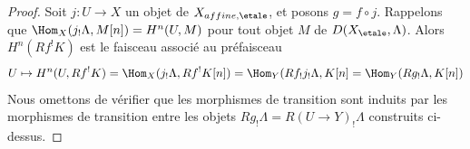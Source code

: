 \begin{proof}
Soit $j : U \to X$ un objet de $X_{affine, \etale}$, et posons $g = f \circ j$.
Rappelons que $\Hom_X(j_!\Lambda, M[n]) = H^n(U, M)$ pour tout objet $M$ de
$D(X_\etale, \Lambda)$. Alors $H^n(Rf^!K)$ est le faisceau associé au
préfaisceau
$$
U \mapsto H^n(U, Rf^!K) = \Hom_X(j_!\Lambda, Rf^!K[n]) =
\Hom_Y(Rf_!j_!\Lambda, K[n] = \Hom_Y(Rg_!\Lambda, K[n])
$$
Nous omettons de vérifier que les morphismes de transition sont induits par les morphismes
de transition entre les objets $Rg_!\Lambda = R(U \to Y)_!\Lambda$ construits
ci-dessus.
\end{proof}






















